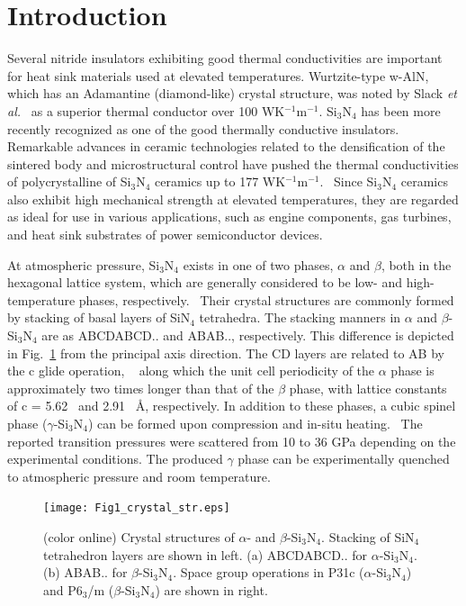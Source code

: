 \documentclass[twocolumn,amsmath,amssymb,a4paper,prb,superscriptaddress,floatfix]{revtex4-1}
\begin{document}
\maketitle

\section{Introduction}
Several nitride insulators exhibiting good thermal conductivities are important
for heat sink materials used at elevated temperatures. Wurtzite-type w-AlN,
which has an Adamantine (diamond-like) crystal structure, was noted by Slack
{\it et al.}~\cite{slack} as a superior thermal conductor over 100 WK$^{-1}$m$^{-1}$.
Si$_3$N$_4$ has been more recently recognized as one of the good thermally
conductive insulators. Remarkable advances in ceramic technologies related to
the densification of the sintered body and microstructural control have pushed
the thermal conductivities of polycrystalline of Si$_3$N$_4$ ceramics up to 177
WK$^{-1}$m$^{-1}$.~\cite{zhou,hirao,watari,hirosaki} Since Si$_3$N$_4$ ceramics
also exhibit high mechanical strength at elevated temperatures, they are
regarded as ideal for use in various applications, such as engine components,
gas turbines, and heat sink substrates of power semiconductor devices.

At atmospheric pressure, Si$_3$N$_4$ exists in one of two phases, $\alpha$ and
$\beta$, both in the hexagonal lattice system, which are generally considered
to be low- and high-temperature phases,
respectively.~\cite{zhou,hirosaki,riley} Their crystal structures are commonly
formed by stacking of basal layers of SiN$_4$ tetrahedra.  The stacking manners
in $\alpha$ and $\beta$-Si$_3$N$_4$ are as ABCDABCD.. and ABAB.., respectively.
This difference is depicted in Fig.~\ref{fig:Fig1_cryst} from the principal
axis direction.  The CD layers are related to AB by the c glide operation,
~\cite{hampshire} along which the unit cell periodicity of the $\alpha$ phase
is approximately two times longer than that of the $\beta$ phase, with lattice
constants of c = 5.62~\cite{yashima} and 2.91~\cite{boulay} \AA, respectively.
In addition to these phases, a cubic spinel phase ($\gamma$-Si$_3$N$_4$) can be
formed upon compression and in-situ heating.~\cite{zerr,zhang} The reported
transition pressures were scattered from 10 to 36 GPa depending on the
experimental conditions.  The produced $\gamma$ phase can be experimentally
quenched to atmospheric pressure and room temperature.

\begin{figure}[ht]
 \begin{center}
  \texttt{[image: Fig1\_crystal\_str.eps]} \caption{(color
  online) Crystal structures of $\alpha$- and $\beta$-Si$_3$N$_4$. Stacking of
  SiN$_4$ tetrahedron layers are shown in left. (a) ABCDABCD.. for
  $\alpha$-Si$_3$N$_4$. (b) ABAB.. for $\beta$-Si$_3$N$_4$.  Space group
  operations in P31c ($\alpha$-Si$_3$N$_4$) and P6$_3$/m ($\beta$-Si$_3$N$_4$)
  are shown in right.}
  \label{fig:Fig1_cryst} 
 \end{center}
\end{figure}
\end{document}
